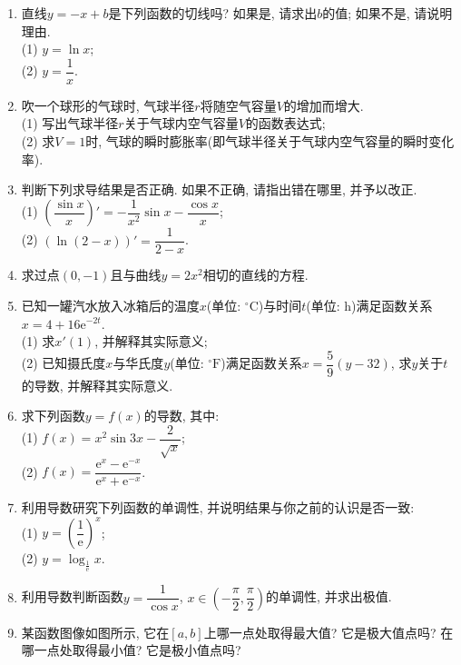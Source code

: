 \documentclass[10pt,a4paper]{article}
\begin{document}
\begin{enumerate}[1.]
\item 直线$y=-x+b$是下列函数的切线吗? 如果是, 请求出$b$的值; 如果不是, 请说明理由.\\
(1) $y=\ln x$;\\
(2) $y=\dfrac 1x$.
\item 吹一个球形的气球时, 气球半径$r$将随空气容量$V$的增加而增大.\\
(1) 写出气球半径$r$关于气球内空气容量$V$的函数表达式;\\
(2) 求$V=1$时, 气球的瞬时膨胀率(即气球半径关于气球内空气容量的瞬时变化率).
\item 判断下列求导结果是否正确. 如果不正确, 请指出错在哪里, 并予以改正.\\
(1) $(\dfrac{\sin x}x)'=-\dfrac 1{x^2}\sin x-\dfrac{\cos x}x$;\\
(2) $(\ln (2-x))'=\dfrac 1{2-x}$.
\item 求过点$(0, -1)$且与曲线$y=2x^2$相切的直线的方程.
\item 已知一罐汽水放入冰箱后的温度$x$(单位: $^\circ\text{C}$)与时间$t$(单位: $\text{h}$)满足函数关系$x=4+16\mathrm{e}^{-2t}$.\\
(1) 求$x'(1)$, 并解释其实际意义;\\
(2) 已知摄氏度$x$与华氏度$y$(单位: $^\circ\text{F}$)满足函数关系$x=\dfrac 59(y-32)$, 求$y$关于$t$的导数, 并解释其实际意义.
\item 求下列函数$y=f(x)$的导数, 其中:\\
(1) $f(x)=x^2\sin 3x-\dfrac 2{\sqrt x}$;\\
(2) $f(x)=\dfrac{\mathrm{e}^x-\mathrm{e}^{-x}}{\mathrm{e}^x+\mathrm{e}^{-x}}$.
\item 利用导数研究下列函数的单调性, 并说明结果与你之前的认识是否一致:\\
(1) $y=(\dfrac 1{\mathrm{e}})^x$;\\
(2) $y=\log_{\frac 1{\mathrm{e}}}x$.
\item 利用导数判断函数$y= \dfrac 1{\cos x}$, $x\in (-\dfrac\pi 2, \dfrac \pi 2)$的单调性, 并求出极值.
\item 某函数图像如图所示, 它在$[a, b]$上哪一点处取得最大值? 它是极大值点吗? 在哪一点处取得最小值? 它是极小值点吗? 
\begin{center}
\end{center}
\end{enumerate}
\end{document}
